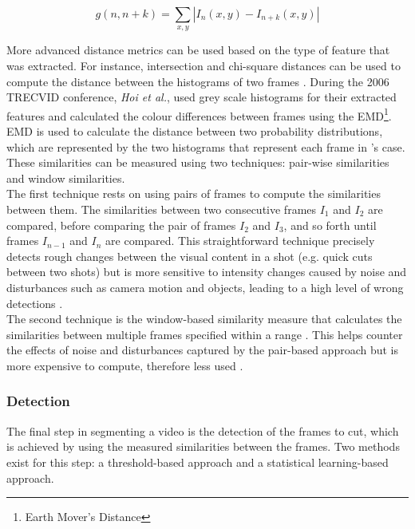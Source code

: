 \begin{equation}
\label{eq:absolutevalue}
    g(n,n+k) = \sum _{x,y} | I_n(x,y) - I_{n+k}(x,y) |
\end{equation}

More advanced distance metrics can be used based on the type of feature that was extracted. For instance, intersection and chi-square distances can be used to compute the distance between the histograms of two frames \cite[p.197]{camara2007shot}. During the 2006 TRECVID conference, \textit{Hoi et al.}, used grey scale histograms for their extracted features and calculated the colour differences between frames using the EMD\footnote{Earth Mover's Distance}. EMD is used to calculate the distance between two probability distributions, which are represented by the two histograms that represent each frame in \cite[p.2]{hoi2006trecvid06}'s case. These similarities can be measured using two techniques: pair-wise similarities and window similarities.\\

The first technique rests on using pairs of frames to compute the similarities between them. The similarities between two consecutive frames $I_1$ and $I_2$ are compared, before comparing the pair of frames $I_2$ and $I_3$, and so forth until frames $I_{n-1}$ and $I_n$ are compared. This straightforward technique precisely detects rough changes between the visual content in a shot (e.g. quick cuts between two shots) but is more sensitive to intensity changes caused by noise and disturbances such as camera motion and objects, leading to a high level of wrong detections \cite{janwe2013video}.\\

The second technique is the window-based similarity measure that calculates the similarities between multiple frames specified within a range \cite{cernekova2006information}. This helps counter the effects of noise and disturbances captured by the pair-based approach but is more expensive to compute, therefore less used \cite{hu2011survey}.

\subsubsection{Detection}
\label{sec:litsurvey-shot-boundary-detection}

The final step in segmenting a video is the detection of the frames to cut, which is achieved by using the measured similarities between the frames. Two methods exist for this step: a threshold-based approach and a statistical learning-based approach.\\

